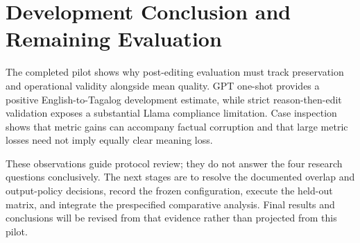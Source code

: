 \section{Development Conclusion and Remaining Evaluation}
The completed pilot shows why post-editing evaluation must track preservation and operational validity alongside mean quality. GPT one-shot provides a positive English-to-Tagalog development estimate, while strict reason-then-edit validation exposes a substantial Llama compliance limitation. Case inspection shows that metric gains can accompany factual corruption and that large metric losses need not imply equally clear meaning loss.

These observations guide protocol review; they do not answer the four research questions conclusively. The next stages are to resolve the documented overlap and output-policy decisions, record the frozen configuration, execute the held-out matrix, and integrate the prespecified comparative analysis. Final results and conclusions will be revised from that evidence rather than projected from this pilot.
